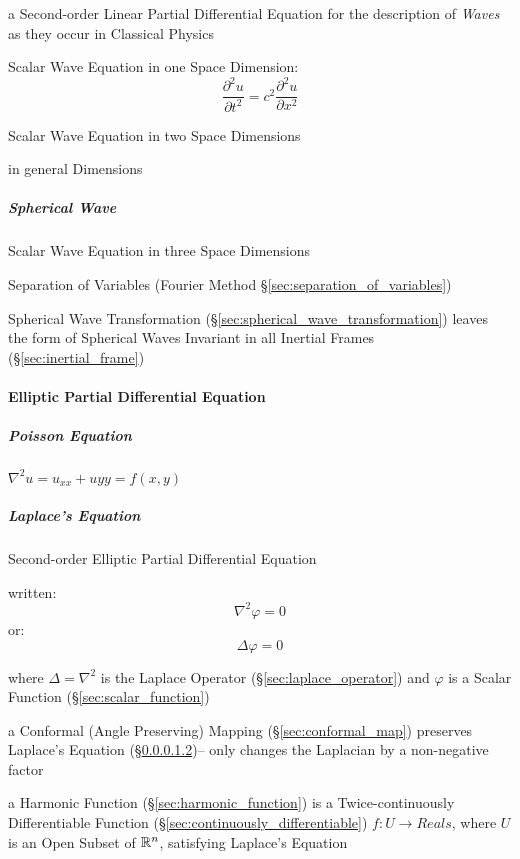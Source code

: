 a Second-order Linear Partial Differential Equation for the description of
\emph{Waves} as they occur in Classical Physics

Scalar Wave Equation in one Space Dimension:
\[
  \frac{\partial^2 u}{\partial{t}^2} = c^2 \frac{\partial^2 u}{\partial{x}^2}
\]

Scalar Wave Equation in two Space Dimensions

in general Dimensions



\subparagraph{Spherical Wave}\label{sec:spherical_wave}\hfill

Scalar Wave Equation in three Space Dimensions

Separation of Variables (Fourier Method \S\ref{sec:separation_of_variables})

Spherical Wave Transformation (\S\ref{sec:spherical_wave_transformation})
leaves the form of Spherical Waves Invariant in all Inertial Frames
(\S\ref{sec:inertial_frame})



\paragraph{Elliptic Partial Differential Equation}
\label{sec:elliptic_partial_differential}\hfill

\subparagraph{Poisson Equation}\label{sec:poisson_equation}\hfill

$\nabla^2 u = u_{xx} + u{yy} = f(x,y)$



\subparagraph{Laplace's Equation}\label{sec:laplaces_equation}\hfill

Second-order Elliptic Partial Differential Equation

written:
\[ \nabla^2 \varphi = 0 \]
or:
\[ \Delta \varphi = 0 \]

where $\Delta = \nabla^2$ is the Laplace Operator
(\S\ref{sec:laplace_operator}) and $\varphi$ is a Scalar Function
(\S\ref{sec:scalar_function})

a Conformal (Angle Preserving) Mapping (\S\ref{sec:conformal_map}) preserves
Laplace's Equation (\S\ref{sec:laplaces_equation})-- only changes the Laplacian
by a non-negative factor

a Harmonic Function (\S\ref{sec:harmonic_function}) is a Twice-continuously
Differentiable Function (\S\ref{sec:continuously_differentiable}) $f : U
\rightarrow Reals$, where $U$ is an Open Subset of $\mathbb{R}^n$, satisfying
Laplace's Equation

